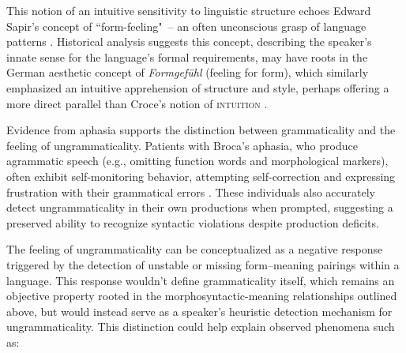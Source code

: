 \documentclass[12pt,letterpaper]{article}
\begin{document}
This notion of an intuitive sensitivity to linguistic structure echoes Edward Sapir's concept of ``form-feeling"~-- an often unconscious grasp of language patterns \autocite{Sapir1921, Sapir1927b}. Historical analysis suggests this concept, describing the speaker's innate sense for the language's formal requirements, may have roots in the German aesthetic concept of \textit{Formgefühl} (feeling for form), which similarly emphasized an intuitive apprehension of structure and style, perhaps offering a more direct parallel than Croce's notion of \textsc{intuition} \autocite{Fortis2014, Lipps1897}.

Evidence from aphasia supports the distinction between grammaticality and the feeling of ungrammaticality. Patients with Broca's aphasia, who produce agrammatic speech (e.g., omitting function words and morphological markers), often exhibit self-monitoring behavior, attempting self-correction and expressing frustration with their grammatical errors \autocite{oomen2005}. These individuals also accurately detect ungrammaticality in their own productions when prompted, suggesting a preserved ability to recognize syntactic violations despite production deficits.

The feeling of ungrammaticality can be conceptualized as a negative response triggered by the detection of unstable or missing form--meaning pairings within a language. This response wouldn't define grammaticality itself, which remains an objective property rooted in the morphosyntactic-meaning relationships outlined above, but would instead serve as a speaker's heuristic detection mechanism for ungrammaticality. This distinction could help explain observed phenomena such as:
\end{document}
